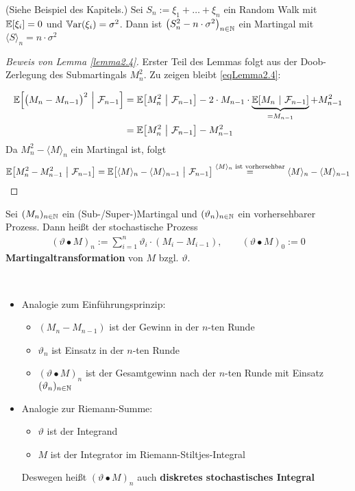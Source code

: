 \begin{beisp} %
	(Siehe Beispiel des Kapitels.) Sei $S_n:=\xi_1+\ldots+\xi_n$ ein Random Walk mit $\mathbb{E}[\xi_i]=0$ und $\mathbb{V}\text{ar}(\xi_i)=\sigma^2$.
	Dann ist
	$\big(S_n^2-n\cdot\sigma^2\big)_{n\in\mathbb{N}}$ ein Martingal mit $\langle S\rangle_n=n\cdot\sigma^2$
\end{beisp}

\begin{proof}[Beweis von Lemma \ref{lemma2.4}]\enter
	Erster Teil des Lemmas folgt aus der Doob-Zerlegung des Submartingals $M_n^2$. Zu zeigen bleibt \eqref{eqLemma2.4}:

	\begin{align*}
		\mathbb{E}\Big[\big(M_n-M_{n-1}\big)^2~\Big|~\mathcal{F}_{n-1}\Big]
		&=\mathbb{E}\big[M_n^2~\big|~\mathcal{F}_{n-1}\big]-2\cdot M_{n-1}\cdot\underbrace{\mathbb{E}[M_n~|~\mathcal{F}_{n-1}]}_{=M_{n-1}}+M^2_{n-1}\\
		&=\mathbb{E}\big[M_n^2~\big|~\mathcal{F}_{n-1}\big] - M_{n-1}^2
	\end{align*}
	Da $M_n^2-\langle M\rangle_n$ ein Martingal ist, folgt
	\begin{align*}
		\mathbb{E}\big[M_n^2-M_{n-1}^2~\big|~\mathcal{F}_{n-1}\big]
		=\mathbb{E}\big[\langle M\rangle_n-\langle M\rangle_{n-1}~\big|~\mathcal{F}_{n-1}\big]
		\stackrel{\langle M\rangle_n\text{ ist vorhersehbar}}{=}\langle M\rangle_n-\langle M\rangle_{n-1}
	\end{align*}
\end{proof}

\begin{defi} %
	Sei $(M_n)_{n\in\mathbb{N}}$ ein (Sub-/Super-)Martingal und $(\vartheta_n)_{n\in\mathbb{N}}$ ein vorhersehbarer Prozess.
	Dann heißt der stochastische Prozess
	\begin{align*}
		(\vartheta\bullet M)_n:=\sum\limits_{i=1}^n\vartheta_i\cdot(M_i-M_{i-1}),\qquad(\vartheta\bullet M)_0:=0
	\end{align*} 
	\textbf{Martingaltransformation} von $M$ bzgl. $\vartheta$.
\end{defi}

\begin{bemerkung}\ %
	\begin{itemize}
		\item Analogie zum Einführungsprinzip:
		\begin{itemize}
			\item $(M_n-M_{n-1})$ ist der Gewinn in der $n$-ten Runde
			\item $\vartheta_n$ ist Einsatz in der $n$-ten Runde
			\item $(\vartheta\bullet M)_n$ ist der Gesamtgewinn nach der $n$-ten Runde mit Einsatz $(\vartheta_n)_{n\in\mathbb{N}}$
		\end{itemize}
		\item Analogie zur Riemann-Summe:
		\begin{itemize}
			\item $\vartheta$ ist der Integrand
			\item $M$ ist der Integrator im Riemann-Stiltjes-Integral
		\end{itemize}
		Deswegen heißt $(\vartheta\bullet M)_n$ auch \textbf{diskretes stochastisches Integral}
	\end{itemize}
\end{bemerkung}

